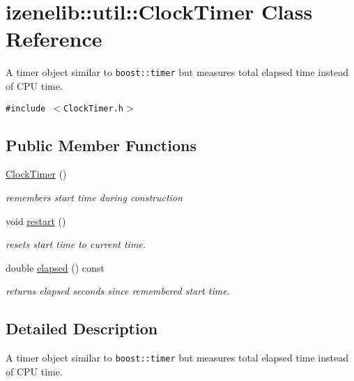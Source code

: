 \hypertarget{classizenelib_1_1util_1_1ClockTimer}{
\section{izenelib::util::ClockTimer Class Reference}
\label{classizenelib_1_1util_1_1ClockTimer}
}
A timer object similar to {\tt boost::timer} but measures total elapsed time instead of CPU time.  


{\tt \#include $<$ClockTimer.h$>$}

\subsection*{Public Member Functions}
\begin{CompactItemize}
\item 
\hypertarget{classizenelib_1_1util_1_1ClockTimer_ff3d08663a3282764bfb90ec07ad10b9}{
\hyperlink{classizenelib_1_1util_1_1ClockTimer_ff3d08663a3282764bfb90ec07ad10b9}{ClockTimer} ()}
\label{classizenelib_1_1util_1_1ClockTimer_ff3d08663a3282764bfb90ec07ad10b9}

\begin{CompactList}\small\item\em remembers start time during construction \item\end{CompactList}\item 
\hypertarget{classizenelib_1_1util_1_1ClockTimer_ddde8c29b63355934ceeeeba417c5b4c}{
void \hyperlink{classizenelib_1_1util_1_1ClockTimer_ddde8c29b63355934ceeeeba417c5b4c}{restart} ()}
\label{classizenelib_1_1util_1_1ClockTimer_ddde8c29b63355934ceeeeba417c5b4c}

\begin{CompactList}\small\item\em resets start time to current time. \item\end{CompactList}\item 
double \hyperlink{classizenelib_1_1util_1_1ClockTimer_bdbd2f2fa3057fdec1144b9660043478}{elapsed} () const 
\begin{CompactList}\small\item\em returns elapsed seconds since remembered start time. \item\end{CompactList}\end{CompactItemize}


\subsection{Detailed Description}
A timer object similar to {\tt boost::timer} but measures total elapsed time instead of CPU time. 

